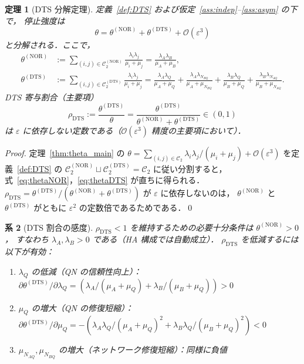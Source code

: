 \documentclass[12pt,a4paper]{article}
\theoremstyle{plain}
\newtheorem{theorem}{定理}[section]
\newtheorem{corollary}[theorem]{系}
\theoremstyle{definition}
\theoremstyle{remark}
\newcommand{\calO}{\mathcal{O}}        %
\newcommand{\eps}{\varepsilon}         %
\newcommand{\calCtwo}{\mathcal{C}_2}   %
\newcommand{\calCNOR}{\calCtwo^{(\mathrm{NOR})}}
\newcommand{\calCDTS}{\calCtwo^{(\mathrm{DTS})}}
\newcommand{\thetaNOR}{\theta^{(\mathrm{NOR})}}
\newcommand{\thetaDTS}{\theta^{(\mathrm{DTS})}}
\newcommand{\rhoDTS}{\rho_{\mathrm{DTS}}}
\begin{document}
\begin{theorem}[DTS 分解定理]\label{thm:DTS}
  定義~\ref{def:DTS} および仮定~\ref{ass:indep}--\ref{ass:asym} の下で，
  停止強度は
  \begin{equation}\label{eq:theta_decomp}
    \theta = \thetaNOR + \thetaDTS + \calO(\eps^3)
  \end{equation}
  と分解される．ここで，
  \begin{align}
    \thetaNOR
    &:= \sum_{(i,j)\in\calCNOR}\frac{\lambda_i\lambda_j}{\mu_i+\mu_j}
     = \frac{\lambda_A\lambda_B}{\mu_A+\mu_B},
    \label{eq:thetaNOR}\\
    \thetaDTS
    &:= \sum_{(i,j)\in\calCDTS}\frac{\lambda_i\lambda_j}{\mu_i+\mu_j}
     = \frac{\lambda_A\lambda_Q}{\mu_A+\mu_Q}
     + \frac{\lambda_A\lambda_{N_{BQ}}}{\mu_A+\mu_{N_{BQ}}}
     + \frac{\lambda_B\lambda_Q}{\mu_B+\mu_Q}
     + \frac{\lambda_B\lambda_{N_{AQ}}}{\mu_B+\mu_{N_{AQ}}}.
    \label{eq:thetaDTS}
  \end{align}
  DTS 寄与割合（主要項）
  \begin{equation}\label{eq:rhoDTS}
    \rhoDTS
    := \frac{\thetaDTS}{\theta}
    = \frac{\thetaDTS}{\thetaNOR+\thetaDTS}
    \in (0,1)
  \end{equation}
  は $\eps$ に依存しない定数である（$\calO(\eps^3)$ 精度の主要項において）．
\end{theorem}

\begin{proof}
  定理~\ref{thm:theta_main} の $\theta = \sum_{(i,j)\in\calCtwo}\lambda_i\lambda_j/(\mu_i+\mu_j)+\calO(\eps^3)$
  を定義~\ref{def:DTS} の $\calCNOR\sqcup\calCDTS = \calCtwo$ に従い分割すると，
  式~\eqref{eq:thetaNOR}，\eqref{eq:thetaDTS} が直ちに得られる．
  $\rhoDTS = \thetaDTS/(\thetaNOR+\thetaDTS)$ が $\eps$ に依存しないのは，
  $\thetaNOR$ と $\thetaDTS$ がともに $\eps^2$ の定数倍であるためである．\qed
\end{proof}

\begin{corollary}[DTS 割合の感度]\label{cor:DTS_sens}
  $\rhoDTS < 1$ を維持するための必要十分条件は $\thetaNOR > 0$，
  すなわち $\lambda_A,\lambda_B > 0$ である（HA 構成では自動成立）．
  $\rhoDTS$ を低減するには以下が有効：
  \begin{enumerate}[label=(\alph*)]
    \item $\lambda_Q$ の低減（QN の信頼性向上）：
          $\partial\thetaDTS/\partial\lambda_Q = (\lambda_A/(\mu_A+\mu_Q)
          + \lambda_B/(\mu_B+\mu_Q)) > 0$
    \item $\mu_Q$ の増大（QN の修復短縮）：
          $\partial\thetaDTS/\partial\mu_Q
          = -(\lambda_A\lambda_Q/(\mu_A+\mu_Q)^2
            + \lambda_B\lambda_Q/(\mu_B+\mu_Q)^2) < 0$
    \item $\mu_{N_{AQ}},\mu_{N_{BQ}}$ の増大（ネットワーク修復短縮）：同様に負値
  \end{enumerate}
\end{corollary}
\end{document}
